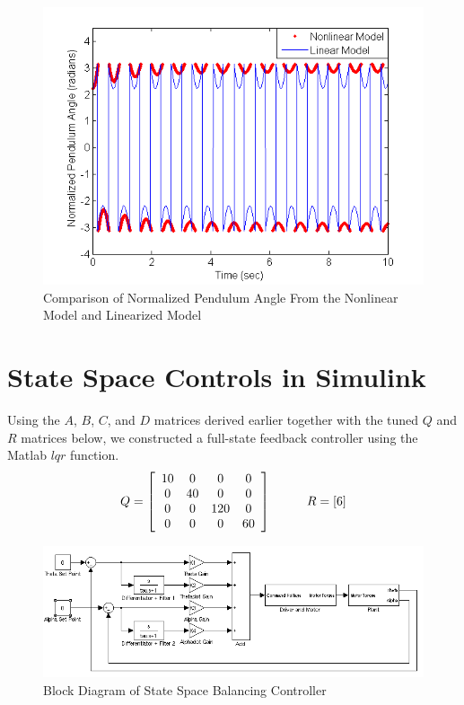 \documentclass{article}
\theoremstyle{plain}
\theoremstyle{definition}
\theoremstyle{remark}
\begin{document}
\begin{figure}[hbt]
\begin{center}
\includegraphics[width = 13cm]{linearAndNonlinear.png}
\end{center}
\caption{Comparison of Normalized Pendulum Angle From the Nonlinear Model and Linearized Model}
\label{q3_6}
\end{figure}


\clearpage
\section{State Space Controls in Simulink}



Using the $A$, $B$, $C$, and $D$ matrices derived earlier together with the tuned $Q$ and $R$ matrices below, we constructed a full-state feedback controller using the Matlab $lqr$ function.  
$$Q = \left[\begin{array}{c c c c l} 10 & 0 & 0 & 0 \\ 0 & 40 & 0 & 0 \\ 0 & 0 & 120 & 0 \\ 0 & 0 & 0 & 60 \\  \end{array} \right] \hspace{1cm} R = \left[ 6 \right]$$

\begin{figure}[hbt]
\begin{center}
\includegraphics[width = 16cm]{stateSpaceFeedbackBlock.png}
\end{center}
\caption{Block Diagram of State Space Balancing Controller}
\label{StateSpaceBlock}
\end{figure}
\end{document}
